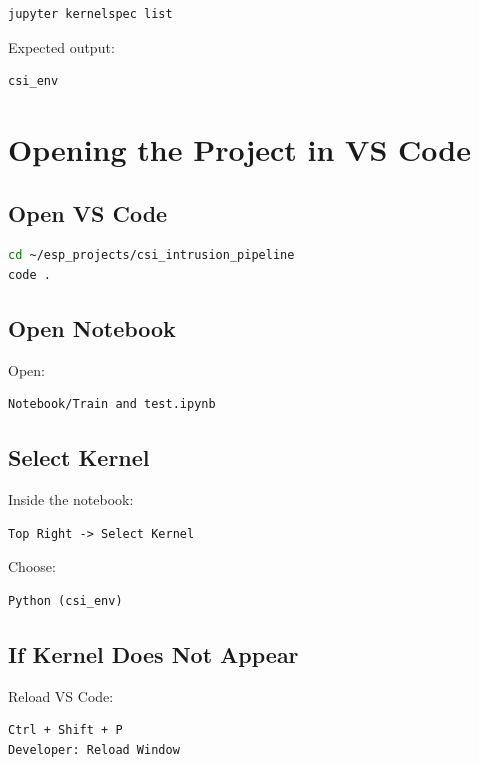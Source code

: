 \documentclass[12pt,a4paper]{article}
\begin{document}
\begin{lstlisting}[language=bash]
jupyter kernelspec list
\end{lstlisting}

Expected output:

\begin{verbatim}
csi_env
\end{verbatim}

\section{Opening the Project in VS Code}

\subsection{Open VS Code}

\begin{lstlisting}[language=bash]
cd ~/esp_projects/csi_intrusion_pipeline
code .
\end{lstlisting}

\subsection{Open Notebook}

Open:

\begin{verbatim}
Notebook/Train and test.ipynb
\end{verbatim}

\subsection{Select Kernel}

Inside the notebook:

\begin{verbatim}
Top Right -> Select Kernel
\end{verbatim}

Choose:

\begin{verbatim}
Python (csi_env)
\end{verbatim}

\subsection{If Kernel Does Not Appear}

Reload VS Code:

\begin{verbatim}
Ctrl + Shift + P
Developer: Reload Window
\end{verbatim}
\end{document}
